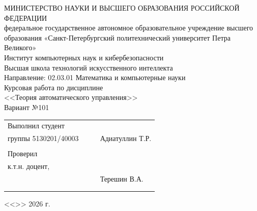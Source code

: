 \documentclass[a4paper]{extarticle}
\begin{document}
\begin{center}
    \hfill\break\hfill\break
    \normalsize{МИНИСТЕРСТВО НАУКИ И ВЫСШЕГО ОБРАЗОВАНИЯ РОССИЙСКОЙ ФЕДЕРАЦИИ\\
    федеральное государственное автономное образовательное учреждение высшего образования
    «Санкт-Петербургский политехнический университет Петра Великого»\\[10pt]}
    \normalsize{Институт компьютерных наук и кибербезопасности}\\[10pt]
    \normalsize{Высшая школа технологий искусственного интеллекта}\\[10pt]
    \normalsize{Направление: 02.03.01 Математика и компьютерные науки}\\
    \vspace{75pt}
    {\large Курсовая работа по дисциплине\\
    <<Теория автоматического управления>>\\Вариант №101}\\
    \hfill\break\hfill\break\hfill\break
\end{center}

\small{
\begin{tabular}{lrrl}
    \!\!\!Выполнил студент & \hspace{0cm} & & \\
    \!\!\!группы 5130201/40003 & \hspace{1.5cm} & \underline{\hspace{3cm}} & \hspace{-0.3cm} Адиатуллин Т.Р.\\\\
    \!\!\!Проверил & \hspace{0cm} & & \\
    \!\!\!к.т.н. доцент, & \hspace{1cm} & \\
    \!\!\! & \hspace{1cm} & \underline{\hspace{3cm}} & Терешин В.А. \\\\
    &&\hspace{5cm}
\end{tabular}
\begin{flushright}
    <<\underline{\hspace{1cm}}>>\underline{\hspace{2.5cm}} 2026 г.
\end{flushright}
}
\end{document}
